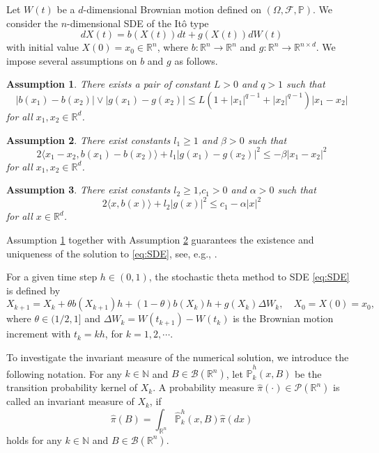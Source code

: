 \documentclass{article}
\newtheorem{assumption}{Assumption}[section]
\begin{document}
Let $W(t)$ be a $d$-dimensional Brownian motion defined on $(\Omega,\mathcal{F},\mathbb{P})$. We consider the $n$-dimensional SDE of the It\^o type
\begin{equation}\label{eq:SDE}
dX(t)=b(X(t))dt+g(X(t))dW(t)
\end{equation}
with initial value $X(0)=x_0\in\mathbb{R}^n$, where $b:\mathbb{R}^n\rightarrow \mathbb{R}^n$ and $g:\mathbb{R}^n\rightarrow\mathbb{R}^{n\times d}$. We impose several assumptions on $b$ and $g$ as follows.
\begin{assumption}\label{assum:2.1}
There exists a pair of constant $L>0$ and $q>1$ such that 
\begin{equation*}
	|b(x_1)-b(x_2)|\vee |g(x_1)-g(x_2)|\leq L(1+|x_1|^{q-1}+|x_2|^{q-1})|x_1-x_2|
\end{equation*}
for all $x_1,x_2\in\mathbb{R}^d$.
\end{assumption}
\begin{assumption}\label{assum:2.3}
There exist constants $l_1\geq 1$ and $\beta > 0$ such that
\[2\langle x_1-x_2, b(x_1)-b(x_2)\rangle +l_1|g(x_1)-g(x_2)|^2 \le -\beta|x_1-x_2|^2
\]
for all $x_1,x_2\in\mathbb{R}^d$.
\end{assumption}
\begin{assumption}\label{assum:2.2}
There exist constants $l_2\geq 1$,$c_1 > 0$ and $\alpha > 0$ such that
\[2\langle x, b(x)\rangle + l_2|g(x)|^2 \le c_1 -\alpha|x|^2
\]
for all $x \in \mathbb{R}^d$.
\end{assumption}

Assumption \ref{assum:2.1} together with Assumption \ref{assum:2.3} guarantees the existence and uniqueness of the solution to \eqref{eq:SDE}, see, e.g., \cite[Theorem~3.4]{Mao2007}.

For a given time step $h\in(0,1)$, the stochastic theta method to SDE \eqref{eq:SDE} is defined by 
\begin{equation}\label{eq:NumSDE}
X_{k+1}=X_k+\theta b(X_{k+1})h+(1-\theta)b(X_k)h+g(X_k)\Delta W_k, \quad X_0=X(0)=x_0,
\end{equation}
where $\theta\in(1/2,1]$ and $\Delta W_k=W(t_{k+1})-W(t_k)$ is the Brownian motion increment with $t_k=kh$, for $k=1,2,\cdots$.

To investigate the invariant measure of the numerical solution, we introduce the following notation. For any $k\in\mathbb{N}$ and $B\in\mathcal{B}(\mathbb{R}^n)$, let $\hat{\mathbb{P}}_k^h(x,B)$ be the transition probability kernel of $
X_k$. A probability measure $\hat{\pi}(\cdot)\in\mathcal{P}(\mathbb{R}^n)$ is called an invariant measure of $X_k$, if 
\begin{equation*}
\hat{\pi}(B)=\int_{\mathbb{R}^n}\hat{\mathbb{P}}_k^h(x,B)\hat{\pi}(dx)
\end{equation*}
holds for any $k\in\mathbb{N}$ and $B\in\mathcal{B}(\mathbb{R}^n)$.
\end{document}

